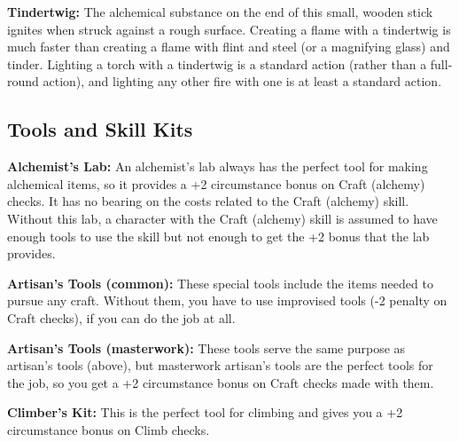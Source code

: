 \textbf{Tindertwig:} The alchemical substance on the end of this small, wooden 
stick ignites when struck against a rough surface. Creating a flame with a tindertwig 
is much faster than creating a flame with flint and steel (or a magnifying glass) 
and tinder. Lighting a torch with a tindertwig is a standard action (rather than 
a full-round action), and lighting any other fire with one is at least a standard 
action.

\subsection{Tools and Skill Kits}

\textbf{Alchemist's Lab:} An alchemist's lab always has the perfect tool for making 
alchemical items, so it provides a +2 circumstance bonus on Craft (alchemy) checks. 
It has no bearing on the costs related to the Craft (alchemy) skill. Without this 
lab, a character with the Craft (alchemy) skill is assumed to have enough tools 
to use the skill but not enough to get the +2 bonus that the lab provides.

\textbf{Artisan's Tools (common):} These special tools include the items needed to pursue 
any craft. Without them, you have to use improvised tools (-2 penalty on Craft 
checks), if you can do the job at all.

\textbf{Artisan's Tools (masterwork):} These tools serve the same purpose as artisan's 
tools (above), but masterwork artisan's tools are the perfect tools for the job, 
so you get a +2 circumstance bonus on Craft checks made with them.

\textbf{Climber's Kit:} This is the perfect tool for climbing and gives you a +2 
circumstance bonus on Climb checks.

